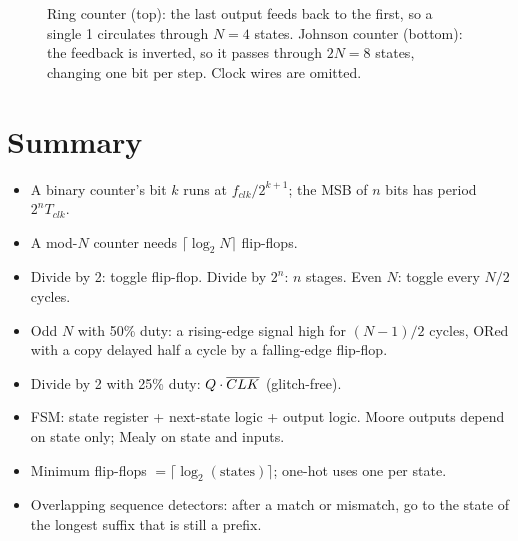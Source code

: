 \begin{figure}[h]
\centering
{}
\caption{Ring counter (top): the last output feeds back to the first, so a single 1 circulates through $N = 4$ states. Johnson counter (bottom): the feedback is inverted, so it passes through $2N = 8$ states, changing one bit per step. Clock wires are omitted.}
\label{fig:johnson}
\end{figure}

\section{Summary}

\begin{itemize}
  \item A binary counter's bit $k$ runs at $f_{clk}/2^{k+1}$; the MSB of $n$ bits has period $2^n T_{clk}$.
  \item A mod-$N$ counter needs $\lceil\log_2 N\rceil$ flip-flops.
  \item Divide by 2: toggle flip-flop. Divide by $2^n$: $n$ stages. Even $N$: toggle every $N/2$ cycles.
  \item Odd $N$ with 50\% duty: a rising-edge signal high for $(N-1)/2$ cycles, ORed with a copy delayed half a cycle by a falling-edge flip-flop.
  \item Divide by 2 with 25\% duty: $Q \cdot \overline{CLK}$ (glitch-free).
  \item FSM: state register + next-state logic + output logic. Moore outputs depend on state only; Mealy on state and inputs.
  \item Minimum flip-flops $= \lceil\log_2(\text{states})\rceil$; one-hot uses one per state.
  \item Overlapping sequence detectors: after a match or mismatch, go to the state of the longest suffix that is still a prefix.
\end{itemize}

